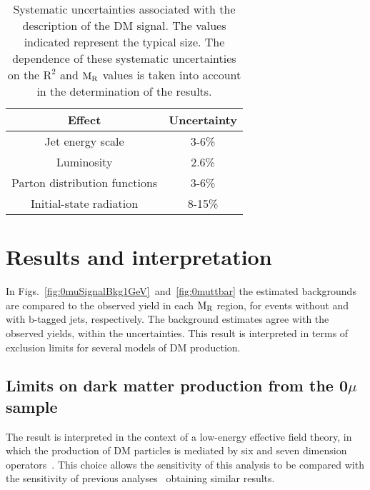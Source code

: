 {{{\begin{table}[h!]
 \caption{\label{tab:sygSys} Systematic uncertainties associated with
  the description of the DM signal. The values indicated represent
  the typical size. The dependence of these systematic uncertainties on
  the $\mathrm{R^2}$ and $\mathrm{M_{\rm R}}$ values is taken into
  account in the determination of the results.}
 \centering
 \begin{tabular}{|c|c|} 
  \hline
  Effect  &  Uncertainty\\
  \hline
  Jet energy scale  &  3-6\%\\
  Luminosity  &  2.6\%\\
  Parton distribution functions  &  3-6\%\\
  Initial-state radiation  &  8-15\%\\
  \hline
\end{tabular}
\end{table}

\section{Results and interpretation}\label{sec:interpretation}

In Figs.~\ref{fig:0muSignalBkg1GeV}~and~\ref{fig:0muttbar} the
estimated backgrounds are compared to the observed yield in each
$\mathrm{M_{\rm R}}$ region, for events without and with
b-tagged jets, respectively. The background estimates agree with the observed
yields, within the uncertainties. This result is interpreted in terms of exclusion limits 
for several models of DM production.



\subsection{Limits on dark matter production from the 0$\mu$ sample}\label{0muResults}
\label{sec:EFT0mu}
The result is interpreted in the context of a low-energy effective
field theory, in which
the production of DM particles is mediated by six and seven dimension 
operators~\cite{maverickDM,TevatronDMFrontier}. This choice allows the sensitivity of this analysis to be 
compared with the sensitivity of previous analyses~\cite{Aad:2011xw,Chatrchyan:2012me} obtaining similar 
results.

}}}
